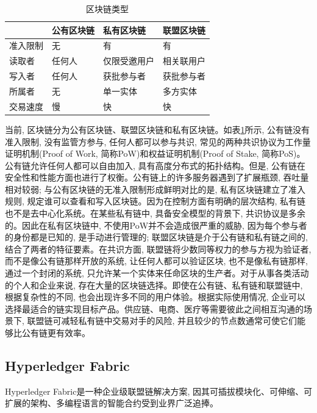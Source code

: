 {\footnotesize
\begin{longtable}[h]{m{70pt} m{70pt} m{70pt} m{70pt}}
    \caption[区块链类型]{区块链类型} \label{blockchain_type} \\
        \toprule   
        &\textbf{公有区块链}&\textbf{私有区块链}&\textbf{联盟区块链}\\
        \hline
        准入限制&无&有&有\\
        
        读取者&任何人&仅限受邀用户&相关联用户\\
        
        写入者&任何人&获批参与者&获批参与者\\
        
        所属者&无&单一实体&多方实体\\
        
        交易速度&慢&快&快\\
        \bottomrule
    \end{longtable}
}

当前, 区块链分为公有区块链、联盟区块链和私有区块链。如表\ref{blockchain_type}所示, 公有链没有准入限制, 没有监管方参与, 任何人都可以参与共识, 常见的两种共识协议为工作量证明机制(Proof of Work, 简称PoW)和权益证明机制(Proof of Stake, 简称PoS)。公有链允许任何人都可以自由加入, 具有高度分布式的拓扑结构。但是, 公有链在安全性和性能方面也进行了权衡。公有链上的许多服务器遇到了扩展瓶颈, 吞吐量相对较弱; 与公有区块链的无准入限制形成鲜明对比的是, 私有区块链建立了准入规则, 规定谁可以查看和写入区块链。因为在控制方面有明确的层次结构, 私有链也不是去中心化系统。在某些私有链中, 具备安全模型的背景下, 共识协议是多余的。因此在私有区块链中, 不使用PoW并不会造成很严重的威胁, 因为每个参与者的身份都是已知的, 是手动进行管理的; 联盟区块链是介于公有链和私有链之间的, 结合了两者的特征要素。在共识方面, 联盟链将少数同等权力的参与方视为验证者, 而不是像公有链那样开放的系统, 让任何人都可以验证区块, 也不是像私有链那样, 通过一个封闭的系统, 只允许某一个实体来任命区块的生产者。对于从事各类活动的个人和企业来说, 存在大量的区块链选择。即使在公有链、私有链和联盟链中, 根据复杂性的不同, 也会出现许多不同的用户体验。根据实际使用情况, 企业可以选择最适合的链实现目标产品。供应链、电商、医疗等需要彼此之间相互沟通的场景下, 联盟链可减轻私有链中交易对手的风险, 并且较少的节点数通常可使它们能够比公有链更有效率。

\subsection{Hyperledger Fabric}
Hyperledger Fabric\footnotemark[1]是一种企业级联盟链解决方案, 因其可插拔模块化、可伸缩、可扩展的架构、多编程语言的智能合约受到业界广泛追捧。

